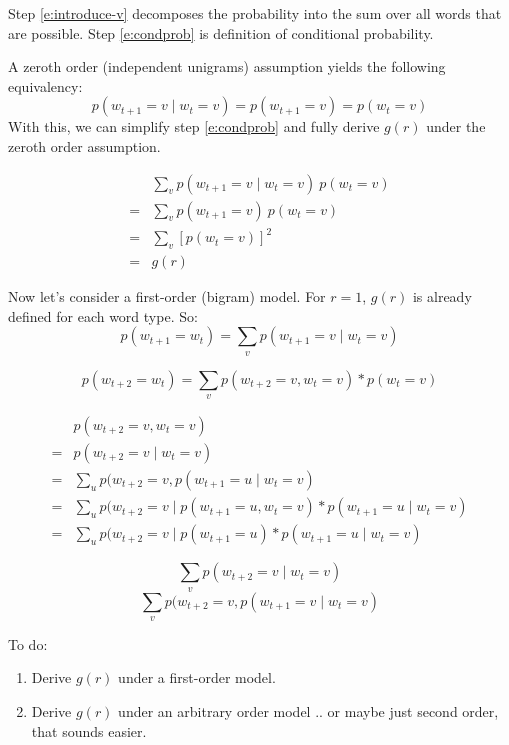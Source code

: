 \documentclass[11pt,letterpaper]{article}
\theoremstyle{definition}
\begin{document}
Step \ref{e:introduce-v} decomposes the probability into the sum over all words that are possible.  Step \ref{e:condprob} is definition of conditional probability.


A zeroth order (independent unigrams) assumption yields the following equivalency:
\[p(w_{t+1}=v \mid w_t=v) = p(w_{t+1}=v) = p(w_{t}=v)\]
With this, we can simplify step \ref{e:condprob} and fully derive $g(r)$ under the zeroth order assumption.

\begin{align}
&\sum_v p(w_{t+1}=v \mid w_t=v)\ p(w_t=v) \\
= &\sum_v p(w_{t+1}=v)\ p(w_t=v)\\
= &\sum_v [p(w_{t}=v)]^2  \\
= &g(r) 
\end{align}

Now let's consider a first-order (bigram) model. For $r=1$, $g(r)$ is already defined for each word type. So:
\[p(w_{t+1} = w_{t}) =  \sum_v p(w_{t+1} = v \mid w_{t} = v)\]


\[p(w_{t+2} = w_{t}) =  \sum_v p(w_{t+2} = v , w_{t} = v) * p(w_{t} = v) \]

\begin{align}
&   p(w_{t+2} = v , w_{t} = v)\\
=& p(w_{t+2} = v  \mid w_{t} = v)\\
=& \sum_u p(w_{t+2} = v , p(w_{t+1} = u \mid w_{t} = v)\\
=& \sum_u p(w_{t+2} = v \mid p(w_{t+1} = u , w_{t} = v) * p(w_{t+1} = u \mid w_{t} = v)\\
=& \sum_u p(w_{t+2} = v \mid p(w_{t+1} = u ) * p(w_{t+1} = u \mid w_{t} = v)
\end{align}

\[ \sum_v p(w_{t+2} = v  \mid w_{t} = v)\]
\[ \sum_v p(w_{t+2} = v , p(w_{t+1} = v \mid w_{t} = v)\]









To do:
\begin{enumerate}
\item Derive $g(r)$ under a first-order model.
\item Derive $g(r)$ under an arbitrary order model .. or maybe just second order, that sounds easier.
\end{enumerate}


% 
% 
\end{document}
